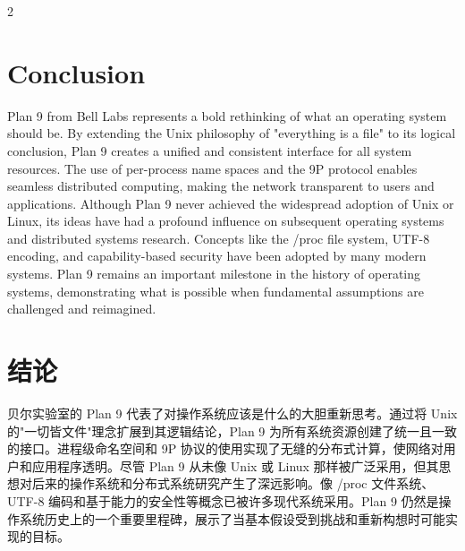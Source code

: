 \documentclass{article}
\begin{document}
\begin{paracol}{2}
\section*{Conclusion}
Plan 9 from Bell Labs represents a bold rethinking of what an operating system should be. By extending the Unix philosophy of "everything is a file" to its logical conclusion, Plan 9 creates a unified and consistent interface for all system resources. The use of per-process name spaces and the 9P protocol enables seamless distributed computing, making the network transparent to users and applications. Although Plan 9 never achieved the widespread adoption of Unix or Linux, its ideas have had a profound influence on subsequent operating systems and distributed systems research. Concepts like the /proc file system, UTF-8 encoding, and capability-based security have been adopted by many modern systems. Plan 9 remains an important milestone in the history of operating systems, demonstrating what is possible when fundamental assumptions are challenged and reimagined.
\switchcolumn
\section*{结论}
贝尔实验室的 Plan 9 代表了对操作系统应该是什么的大胆重新思考。通过将 Unix 的"一切皆文件"理念扩展到其逻辑结论，Plan 9 为所有系统资源创建了统一且一致的接口。进程级命名空间和 9P 协议的使用实现了无缝的分布式计算，使网络对用户和应用程序透明。尽管 Plan 9 从未像 Unix 或 Linux 那样被广泛采用，但其思想对后来的操作系统和分布式系统研究产生了深远影响。像 /proc 文件系统、UTF-8 编码和基于能力的安全性等概念已被许多现代系统采用。Plan 9 仍然是操作系统历史上的一个重要里程碑，展示了当基本假设受到挑战和重新构想时可能实现的目标。
\end{paracol}
\end{document}
